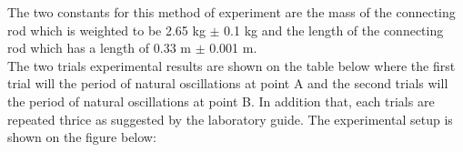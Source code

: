 The two constants for this method of experiment are the mass of the connecting rod which is weighted to be 2.65 kg $\pm$ 0.1 kg and the length of the connecting rod which has a length of 0.33 m $\pm$ 0.001 m. \\

The two trials experimental results are shown on the table below where the first trial will the period of natural oscillations at point A and the second trials will the period of natural oscillations at point B. In addition that, each trials are repeated thrice as suggested by the laboratory guide. The experimental setup is shown on the figure below:\\
